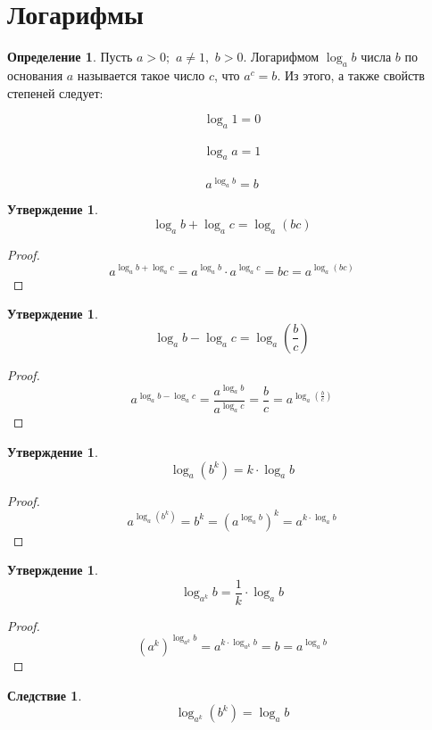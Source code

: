 \documentclass[12pt]{article}
\theoremstyle{definition}
\newtheorem{definition}{Определение}
\newtheorem{statement}[theorem]{Утверждение}
\newtheorem{consequence}{Следствие}[subsection]
\begin{document}
    \section{Логарифмы}
    \begin{definition}
        Пусть $a>0;\,\, a\neq 1,\,\,b>0$. Логарифмом $\log_ab$ числа $b$ по основания $a$ называется такое число $c$, что $a^c=b$. Из этого, а также свойств степеней следует:
        \begin{center}
            \begin{multicols}{3}
                \[\log_a 1=0\]\\
                \[\log_a a=1\]\\
                \[a^{\log_a b}=b\]
            \end{multicols}
        \end{center}
    \end{definition}
    \begin{statement}
        $$\log_a b+\log_a c=\log_a(bc)$$
    \end{statement}
    \begin{proof}
        $$a^{\log_a b+\log_a c}=a^{\log_a b}\cdot a^{\log_a c}=bc=a^{\log_a(bc)}$$
    \end{proof}
    \begin{statement}
        $$\log_a b-\log_a c=\log_a \left(\frac{b}{c}\right)$$
    \end{statement}
    \begin{proof}
        $$a^{\log_a b-\log_a c}=\frac{a^{\log_a b}}{a^{\log_a c}}=\frac{b}{c}=a^{\log_a \left(\frac{b}{c}\right)}$$
    \end{proof}
    \begin{statement}
        $$\log_a \left(b^k\right)=k\cdot\log_a b$$
    \end{statement}
    \begin{proof}
        $$a^{\log_a \left(b^k\right)}=b^k=\left(a^{\log_a b}\right)^k=a^{k\cdot\log_a b}$$
    \end{proof}
    \begin{statement}
        $$\log_{a^k}b=\frac{1}{k}\cdot\log_a b$$
    \end{statement}
    \begin{proof}
        $$\left(a^k\right)^{\log_{a^k}b}=a^{k\cdot\log_{a^k} b}=b=a^{\log_a b}$$
    \end{proof}
    \setcounter{subsection}{4}
    \begin{consequence}
        $$\log_{a^k}\left(b^k\right)=\log_a b$$
    \end{consequence}
\end{document}
